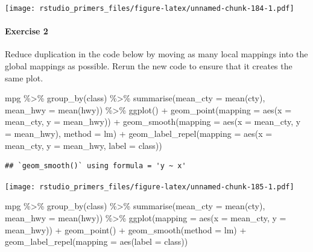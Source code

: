 \documentclass[
]{article}
\newenvironment{Shaded}{\begin{snugshade}}{\end{snugshade}}
\newcommand{\AttributeTok}[1]{\textcolor[rgb]{0.77,0.63,0.00}{#1}}
\newcommand{\FunctionTok}[1]{\textcolor[rgb]{0.00,0.00,0.00}{#1}}
\newcommand{\NormalTok}[1]{#1}
\newcommand{\SpecialCharTok}[1]{\textcolor[rgb]{0.00,0.00,0.00}{#1}}
\begin{document}
\texttt{[image: rstudio\_primers\_files/figure-latex/unnamed-chunk-184-1.pdf]}

\hypertarget{exercise-2-3}{%
\paragraph{Exercise 2}\label{exercise-2-3}}

Reduce duplication in the code below by moving as many local mappings
into the global mappings as possible. Rerun the new code to ensure that
it creates the same plot.

\begin{Shaded}
\begin{Highlighting}[]
\NormalTok{mpg }\SpecialCharTok{\%\textgreater{}\%} 
  \FunctionTok{group\_by}\NormalTok{(class) }\SpecialCharTok{\%\textgreater{}\%} 
  \FunctionTok{summarise}\NormalTok{(}\AttributeTok{mean\_cty =} \FunctionTok{mean}\NormalTok{(cty), }\AttributeTok{mean\_hwy =} \FunctionTok{mean}\NormalTok{(hwy)) }\SpecialCharTok{\%\textgreater{}\%} 
  \FunctionTok{ggplot}\NormalTok{() }\SpecialCharTok{+}
    \FunctionTok{geom\_point}\NormalTok{(}\AttributeTok{mapping =} \FunctionTok{aes}\NormalTok{(}\AttributeTok{x =}\NormalTok{ mean\_cty, }\AttributeTok{y =}\NormalTok{ mean\_hwy)) }\SpecialCharTok{+}
    \FunctionTok{geom\_smooth}\NormalTok{(}\AttributeTok{mapping =} \FunctionTok{aes}\NormalTok{(}\AttributeTok{x =}\NormalTok{ mean\_cty, }\AttributeTok{y =}\NormalTok{ mean\_hwy), }\AttributeTok{method =}\NormalTok{ lm) }\SpecialCharTok{+}
    \FunctionTok{geom\_label\_repel}\NormalTok{(}\AttributeTok{mapping =} \FunctionTok{aes}\NormalTok{(}\AttributeTok{x =}\NormalTok{ mean\_cty, }\AttributeTok{y =}\NormalTok{ mean\_hwy, }\AttributeTok{label =}\NormalTok{ class))}
\end{Highlighting}
\end{Shaded}

\begin{verbatim}
## `geom_smooth()` using formula = 'y ~ x'
\end{verbatim}

\texttt{[image: rstudio\_primers\_files/figure-latex/unnamed-chunk-185-1.pdf]}

\begin{Shaded}
\begin{Highlighting}[]
\NormalTok{mpg }\SpecialCharTok{\%\textgreater{}\%} 
  \FunctionTok{group\_by}\NormalTok{(class) }\SpecialCharTok{\%\textgreater{}\%} 
  \FunctionTok{summarise}\NormalTok{(}\AttributeTok{mean\_cty =} \FunctionTok{mean}\NormalTok{(cty), }\AttributeTok{mean\_hwy =} \FunctionTok{mean}\NormalTok{(hwy)) }\SpecialCharTok{\%\textgreater{}\%} 
  \FunctionTok{ggplot}\NormalTok{(}\AttributeTok{mapping =} \FunctionTok{aes}\NormalTok{(}\AttributeTok{x =}\NormalTok{ mean\_cty, }\AttributeTok{y =}\NormalTok{ mean\_hwy)) }\SpecialCharTok{+}
    \FunctionTok{geom\_point}\NormalTok{() }\SpecialCharTok{+}
    \FunctionTok{geom\_smooth}\NormalTok{(}\AttributeTok{method =}\NormalTok{ lm) }\SpecialCharTok{+}
    \FunctionTok{geom\_label\_repel}\NormalTok{(}\AttributeTok{mapping =} \FunctionTok{aes}\NormalTok{(}\AttributeTok{label =}\NormalTok{ class))}
\end{Highlighting}
\end{Shaded}
\end{document}
